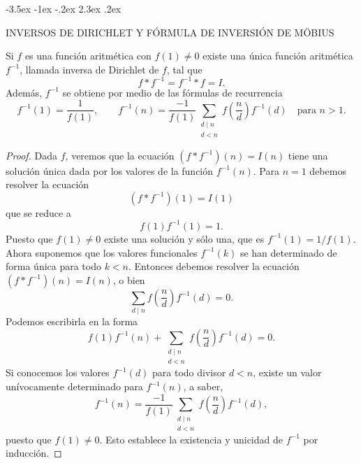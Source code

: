 \documentclass[12pt,a4paper]{book}
\makeatletter
\renewcommand\section{\@startsection{section}{1}{\z@}%
  {-3.5ex \@plus -1ex \@minus -.2ex}%
  {2.3ex \@plus .2ex}%
  {\normalfont\Large\bfseries\raggedright}}
\makeatother
\begin{document}
    \section{INVERSOS DE DIRICHLET Y FÓRMULA DE INVERSIÓN DE MÖBIUS}\label{sim:inv}
    \begin{teorema}
        Si $f$ es una función aritmética con $f(1)\neq0$ existe una única función
        aritmética $f^{-1}$, llamada inversa de Dirichlet de $f$, tal que
        \begin{equation*}
            f*f^{-1}=f^{-1}*f=I.
        \end{equation*}
        Además, $f^{-1}$ se obtiene por medio de las fórmulas de recurrencia
        \begin{equation*}
            f^{-1}(1)=\frac{1}{f(1)},\qquad
            f^{-1}(n)=\frac{-1}{f(1)}\sum_{\substack{d\mid n\\ d<n}}
            f\left(\frac{n}{d}\right)f^{-1}(d)\quad\text{para } n>1.
        \end{equation*}
    \end{teorema}

    \begin{proof}
        Dada $f$, veremos que la ecuación $(f*f^{-1})(n)=I(n)$ tiene una solución única
        dada por los valores de la función $f^{-1}(n)$. Para $n=1$ debemos resolver la
        ecuación
        \begin{equation*}
            (f*f^{-1})(1)=I(1)
        \end{equation*}
        que se reduce a
        \begin{equation*}
            f(1)f^{-1}(1)=1.
        \end{equation*}
        Puesto que $f(1)\neq0$ existe una solución y sólo una, que es $f^{-1}(1)=1/f(1)$.
        Ahora suponemos que los valores funcionales $f^{-1}(k)$ se han determinado de forma
        única para todo $k<n$. Entonces debemos resolver la ecuación $(f*f^{-1})(n)=I(n)$,
        o bien
        \begin{equation*}
            \sum_{d\mid n}f\left(\frac{n}{d}\right)f^{-1}(d)=0.
        \end{equation*}
        Podemos escribirla en la forma
        \begin{equation*}
            f(1)f^{-1}(n)+\sum_{\substack{d\mid n\\ d<n}}f\left(\frac{n}{d}\right)f^{-1}(d)=0.
        \end{equation*}
        Si conocemos los valores $f^{-1}(d)$ para todo divisor $d<n$, existe un valor
        unívocamente determinado para $f^{-1}(n)$, a saber,
        \begin{equation*}
            f^{-1}(n)=\frac{-1}{f(1)}\sum_{\substack{d\mid n\\ d<n}}
            f\left(\frac{n}{d}\right)f^{-1}(d),
        \end{equation*}
        puesto que $f(1)\neq0$. Esto establece la existencia y unicidad de $f^{-1}$ por
        inducción.
    \end{proof}
\end{document}
